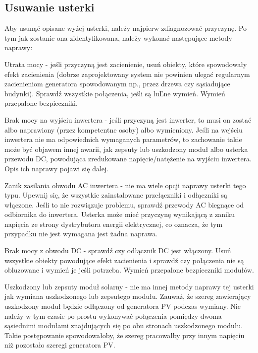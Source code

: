 \documentclass[12pt,a4paper]{article}
\begin{document}
\subsection{Usuwanie usterki}
  

Aby usunąć opisane wyżej usterki, należy najpierw zdiagnozować 
przyczynę. Po tym jak zostanie ona zidentyfikowana, należy wykonać 
następujące metody naprawy: 

 

Utrata mocy - jeśli przyczyną jest zacienienie, usuń obiekty, które 
spowodowały efekt zacienienia (dobrze zaprojektowany system nie powinien 
ulegać regularnym zacienieniom generatora spowodowanym np., przez drzewa 
czy sąsiadujące budynki). Sprawdź wszystkie połączenia, jeśli są luĽne 
wymień. Wymień przepalone bezpieczniki. 

 

Brak mocy na wyjściu inwertera - jeśli przyczyną jest inwerter, to musi 
on zostać albo naprawiony (przez kompetentne osoby) albo wymieniony. 
Jeśli na wejściu inwertera nie ma odpowiednich wymaganych parametrów, to 
zachowanie takie może być objawem innej awarii, jak zepsuty lub 
uszkodzony moduł albo usterka przewodu DC, powodująca zredukowane 
napięcie/natężenie na wyjściu inwertera. Opis ich naprawy pojawi się 
dalej. 

 

Zanik zasilania obwodu AC inwertera - nie ma wiele opcji naprawy usterki 
tego typu. Upewnij się, że wszystkie zainstalowane przełączniki i 
odłączniki są włączone. Jeśli to nie rozwiązuje problemu, sprawdź 
przewody AC biegnące od odbiornika do inwertera. Usterka może mieć 
przyczynę wynikającą z zaniku napięcia ze strony dystrybutora energii 
elektrycznej, co oznacza, że tym przypadku nie jest wymagana jest żadna 
naprawa. 

 

Brak mocy z obwodu DC - sprawdź czy odłącznik DC jest włączony. Usuń 
wszystkie obiekty powodujące efekt zacienienia i sprawdź czy połączenia 
nie są obluzowane i wymień je jeśli potrzeba. Wymień przepalone 
bezpieczniki modułów. 

 

Uszkodzony lub zepsuty moduł solarny - nie ma innej metody naprawy tej 
usterki jak wymiana uszkodzonego lub zepsutego modułu. Zauważ, że szereg 
zawierający uszkodzony moduł będzie odłączony od generatora PV podczas 
wymiany. Nie należy w tym czasie po prostu wykonywać połączenia pomiędzy 
dwoma sąsiednimi modułami znajdujących się po obu stronach uszkodzonego 
modułu. Takie postępowanie spowodowałoby, że szereg pracowałby przy 
innym napięciu niż pozostało szeregi generatora PV. 
\end{document}
